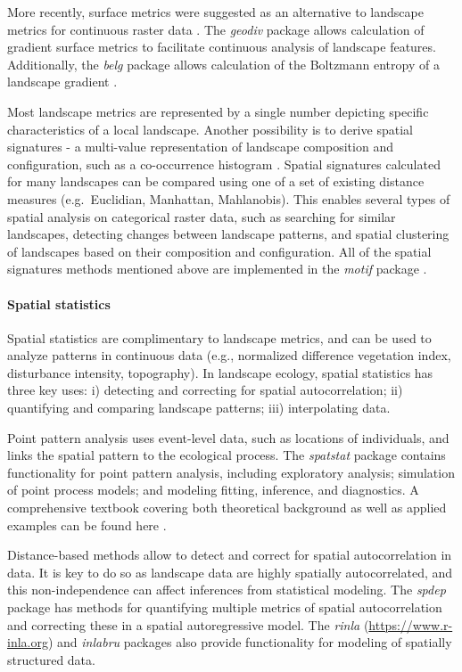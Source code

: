\documentclass[smallextended]{svjour3}       %
\begin{document}
More recently, surface metrics were suggested as an alternative to landscape metrics for continuous raster data \cite{McGarigal2009}.
The \textit{geodiv} package \cite{Smith2020} allows calculation of gradient surface metrics to facilitate continuous analysis of landscape features.
Additionally, the \textit{belg} package allows calculation of the Boltzmann entropy of a landscape gradient \cite{Nowosad2020}.

Most landscape metrics are represented by a single number depicting specific characteristics of a local landscape.
Another possibility is to derive spatial signatures - a multi-value representation of landscape composition and configuration, such as a co-occurrence histogram \cite{Nowosad2021}.
Spatial signatures calculated for many landscapes can be compared using one of a set of existing distance measures (e.g.~Euclidian, Manhattan, Mahlanobis).
This enables several types of spatial analysis on categorical raster data, such as searching for similar landscapes, detecting changes between landscape patterns, and spatial clustering of landscapes based on their composition and configuration.
All of the spatial signatures methods mentioned above are implemented in the \textit{motif} package \cite{Nowosad2021}.

\hypertarget{spatial-statistics}{%
\paragraph{Spatial statistics}\label{spatial-statistics}}

Spatial statistics are complimentary to landscape metrics, and can be used to analyze patterns in continuous data (e.g., normalized difference vegetation index, disturbance intensity, topography).
In landscape ecology, spatial statistics has three key uses: i) detecting and correcting for spatial autocorrelation; ii) quantifying and comparing landscape patterns; iii) interpolating data.

Point pattern analysis uses event-level data, such as locations of individuals, and links the spatial pattern to the ecological process.
The \textit{spatstat} package \cite{Baddeley2005} contains functionality for point pattern analysis, including exploratory analysis; simulation of point process models; and modeling fitting, inference, and diagnostics.
A comprehensive textbook covering both theoretical background as well as applied examples can be found here \cite{Baddeley2015}.

Distance-based methods allow to detect and correct for spatial autocorrelation in data.
It is key to do so as landscape data are highly spatially autocorrelated, and this non-independence can affect inferences from statistical modeling.
The \textit{spdep} package \cite{Bivand2013} has methods for quantifying multiple metrics of spatial autocorrelation and correcting these in a spatial autoregressive model.
The \textit{rinla} \cite{Rue2009} (\url{https://www.r-inla.org}) and \textit{inlabru} \cite{Bachl2019} packages also provide functionality for modeling of spatially structured data.
\end{document}
